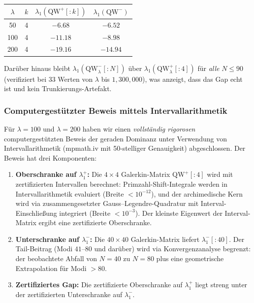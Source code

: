 \documentclass[12pt,a4paper]{article}
\theoremstyle{definition}
\theoremstyle{remark}
\begin{document}
\begin{center}
\begin{tabular}{cccc}
$\lambda$ & $k$ & $\lambda_1(\mathrm{QW}^+[{:}k])$ & $\lambda_1(\mathrm{QW}^-)$ \\
\hline
50  & 4 & $-6.68$ & $-6.52$ \\
100 & 4 & $-11.18$ & $-8.98$ \\
200 & 4 & $-19.16$ & $-14.94$
\end{tabular}
\end{center}

Darüber hinaus bleibt $\lambda_1(\mathrm{QW}_\lambda^-[{:}N])$ über $\lambda_1(\mathrm{QW}_\lambda^+[{:}4])$ für \emph{alle} $N \leq 90$ (verifiziert bei $33$ Werten von $\lambda$ bis $1{,}300{,}000$), was anzeigt, dass das Gap echt ist und kein Trunkierungs-Artefakt.

\label{sec:computer-proof}
\subsubsection{Computergest\"utzter Beweis mittels Intervallarithmetik}

Für $\lambda = 100$ und $\lambda = 200$ haben wir einen \emph{vollständig rigorosen} computergestützten Beweis der geraden Dominanz unter Verwendung von Intervallarithmetik (mpmath.iv mit 50-stelliger Genauigkeit) abgeschlossen. Der Beweis hat drei Komponenten:

\begin{enumerate}
\item \textbf{Oberschranke auf $\lambda_1^+$:} Die $4 \times 4$ Galerkin-Matrix $\mathrm{QW}^+[{:}4]$ wird mit zertifizierten Intervallen berechnet: Primzahl-Shift-Integrale werden in Intervallarithmetik evaluiert (Breite $< 10^{-12}$), und der archimedische Kern wird via zusammengesetzter Gauss--Legendre-Quadratur mit Interval-Einschließung integriert (Breite $< 10^{-3}$). Der kleinste Eigenwert der Interval-Matrix ergibt eine zertifizierte Oberschranke.

\item \textbf{Unterschranke auf $\lambda_1^-$:} Die $40 \times 40$ Galerkin-Matrix liefert $\lambda_1^-[{:}40]$. Der Tail-Beitrag (Modi $41$--$80$ und darüber) wird via Konvergenzanalyse begrenzt: der beobachtete Abfall von $N=40$ zu $N=80$ plus eine geometrische Extrapolation für Modi $>80$.

\item \textbf{Zertifiziertes Gap:} Die zertifizierte Oberschranke auf $\lambda_1^+$ liegt streng unter der zertifizierten Unterschranke auf $\lambda_1^-$.
\end{enumerate}
\end{document}
